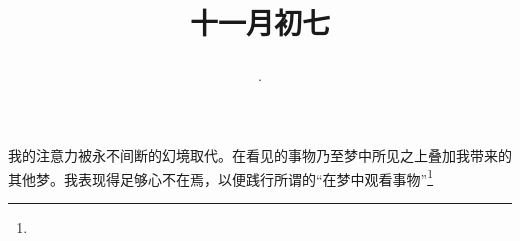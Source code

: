 \title{\date[d=7,m=12,y=2024][year:cn-y,年,month:cn,day:cn,日,·,weekday]·十一月初七 }
我的注意力被永不间断的幻境取代。在看见的事物乃至梦中所见之上叠加我带来的其他梦。我表现得足够心不在焉，以便践行所谓的“在梦中观看事物”\footnote{ }

